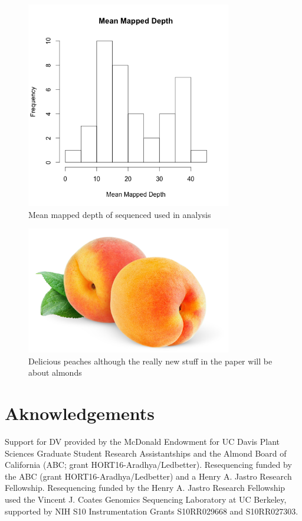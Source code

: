 \documentclass[12pt]{article}
\newcommand{\beginsupplement}{%
        \setcounter{table}{0}
        \renewcommand{\thetable}{S\arabic{table}}%
        \setcounter{figure}{0}
        \renewcommand{\thefigure}{S\arabic{figure}}%
     }
\begin{document}
\pagebreak

%
%
%
\pagebreak
\begin{figure}[b]
\centering
   \includegraphics[width=0.8\textwidth]{depthBQ20MQ30.png}
  \caption{Mean mapped depth of sequenced used in analysis}
  \label{fig:depth}
\end{figure}

\begin{figure}[b]
\centering
   \includegraphics[width=0.8\textwidth]{peachzdfgad.jpg}
  \caption{Delicious peaches although the really new stuff in the paper will be about almonds}
  \label{fig:peach}
\end{figure}
%
\pagebreak
\beginsupplement
\section*{Aknowledgements}
Support for DV provided by the McDonald Endowment for UC Davis Plant Sciences Graduate Student Research Assistantships and the Almond Board of California (ABC; grant HORT16-Aradhya/Ledbetter). Resequencing funded by the ABC (grant HORT16-Aradhya/Ledbetter) and a Henry A. Jastro Research Fellowship. Resequencing funded by the Henry A. Jastro Research Fellowship used the Vincent J. Coates Genomics Sequencing Laboratory at UC Berkeley, supported by NIH S10 Instrumentation Grants S10RR029668 and S10RR027303.
\end{document}
